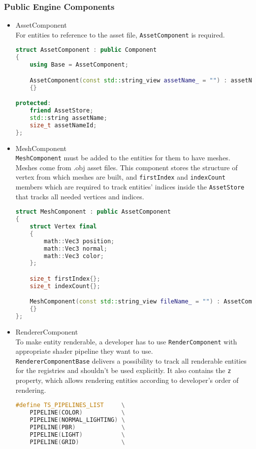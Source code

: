 \subsubsection{Public Engine Components}
\begin{itemize}
    \item AssetComponent\\
    For entities to reference to the asset file, \texttt{AssetComponent} is required.
\begin{lstlisting}[language=c++, caption=\texttt{AssetComponent} struct (./engine/include/tsengine/ecs/components/asset\_component.h)]
struct AssetComponent : public Component
{
    using Base = AssetComponent;

    AssetComponent(const std::string_view assetName_ = "") : assetName{assetName_}, assetNameId{std::hash<std::string_view>{}(assetName_)}
    {}

protected:
    friend AssetStore;
    std::string assetName;
    size_t assetNameId;
};
\end{lstlisting}
    \item MeshComponent\\
    \texttt{MeshComponent} must be added to the entities for them to have meshes.
    Meshes come from .obj asset files.
    This component stores the structure of vertex from which meshes are built, and \texttt{firstIndex} and \texttt{indexCount} members which are required to track entities' indices inside the \texttt{AssetStore} that tracks all needed vertices and indices. 
\begin{lstlisting}[language=c++, caption=\texttt{MeshComponent} struct (./engine/include/tsengine/ecs/components/mesh\_component.h)]
struct MeshComponent : public AssetComponent
{
    struct Vertex final
    {
        math::Vec3 position;
        math::Vec3 normal;
        math::Vec3 color;
    };

    size_t firstIndex{};
    size_t indexCount{};

    MeshComponent(const std::string_view fileName_ = "") : AssetComponent{fileName_}
    {}
};
\end{lstlisting}
    \item RendererComponent\\
    \label{sec:render_component}
    To make entity renderable, a developer has to use \texttt{RenderComponent} with appropriate shader pipeline they want to use.\\
    \texttt{RendererComponentBase} delivers a possibility to track all renderable entities for the registries and shouldn't be used explicitly. It also contains the \texttt{z} property, which allows rendering entities according to developer's order of rendering. 
\begin{lstlisting}[language=c++, caption=\texttt{RendererComponent} struct (./engine/include/tsengine/ecs/components/renderer\_component.h)]
#define TS_PIPELINES_LIST     \
    PIPELINE(COLOR)           \
    PIPELINE(NORMAL_LIGHTING) \
    PIPELINE(PBR)             \
    PIPELINE(LIGHT)           \
    PIPELINE(GRID)            \



\end{lstlisting}
\end{itemize}
